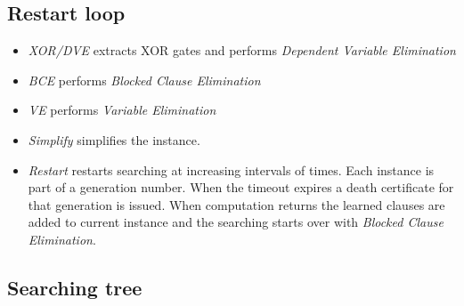 \subsection{Restart loop}

\begin{itemize}
  \item \emph{XOR/DVE} extracts XOR gates and performs \emph{Dependent
  Variable Elimination}

  \item \emph{BCE} performs \emph{Blocked Clause Elimination}

  \item \emph{VE} performs \emph{Variable Elimination}

  \item \emph{Simplify} simplifies the instance.

  \item \emph{Restart} restarts searching at increasing intervals of times.
  Each instance is part of a generation number. When the timeout expires
  a death certificate for that generation is issued. When computation returns
  the learned clauses are added to current instance and the searching starts
  over with \emph{Blocked Clause Elimination}.

\end{itemize}


\subsection{Searching tree}
\label{ssec:searching-tree}

